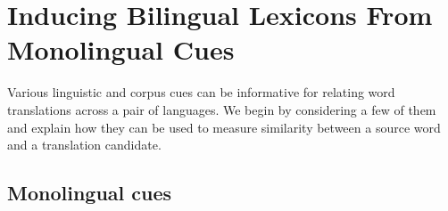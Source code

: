 \documentclass{article}
\newcommand{\mnote}[1]{\marginpar{%
  \vskip-\baselineskip
  \raggedright\footnotesize
  \itshape\hrule\smallskip\tiny{#1}\par\smallskip\hrule}}
\newcommand{\mtodo}[1]{\mnote{\textcolor{red}{#1}}}
\begin{document}

\section{Inducing Bilingual Lexicons From Monolingual Cues}\label{sect:cues}

Various linguistic and corpus cues can be informative for relating word translations across a pair of languages.\mtodo{Little technical details, i.e. no metric defs, etc. Add?}  We begin by considering a few of them and explain how they can be used to measure similarity between a source word and a translation candidate.

\subsection{Monolingual cues}
\end{document}
